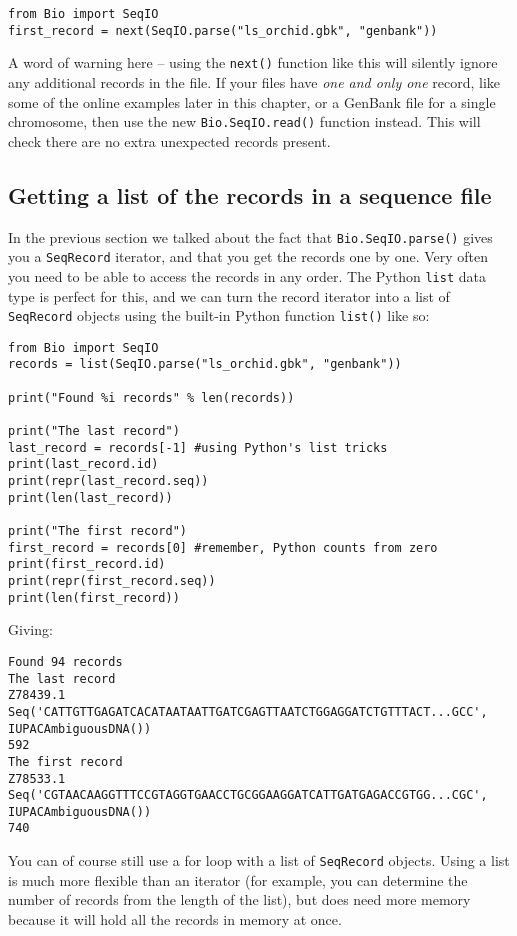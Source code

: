 \begin{verbatim}
from Bio import SeqIO
first_record = next(SeqIO.parse("ls_orchid.gbk", "genbank"))
\end{verbatim}

A word of warning here -- using the \verb|next()| function like this will silently ignore any additional records in the file.
If your files have {\it one and only one} record, like some of the online examples later in this chapter, or a GenBank file for a single chromosome, then use the new \verb|Bio.SeqIO.read()| function instead.
This will check there are no extra unexpected records present.

\subsection{Getting a list of the records in a sequence file}

In the previous section we talked about the fact that \verb|Bio.SeqIO.parse()| gives you a \verb|SeqRecord| iterator, and that you get the records one by one.  Very often you need to be able to access the records in any order. The Python \verb|list| data type is perfect for this, and we can turn the record iterator into a list of \verb|SeqRecord| objects using the built-in Python function \verb|list()| like so:

\begin{verbatim}
from Bio import SeqIO
records = list(SeqIO.parse("ls_orchid.gbk", "genbank"))

print("Found %i records" % len(records))

print("The last record")
last_record = records[-1] #using Python's list tricks
print(last_record.id)
print(repr(last_record.seq))
print(len(last_record))

print("The first record")
first_record = records[0] #remember, Python counts from zero
print(first_record.id)
print(repr(first_record.seq))
print(len(first_record))
\end{verbatim}

\noindent Giving:

\begin{verbatim}
Found 94 records
The last record
Z78439.1
Seq('CATTGTTGAGATCACATAATAATTGATCGAGTTAATCTGGAGGATCTGTTTACT...GCC', IUPACAmbiguousDNA())
592
The first record
Z78533.1
Seq('CGTAACAAGGTTTCCGTAGGTGAACCTGCGGAAGGATCATTGATGAGACCGTGG...CGC', IUPACAmbiguousDNA())
740
\end{verbatim}

You can of course still use a for loop with a list of \verb|SeqRecord| objects.  Using a list is much more flexible than an iterator (for example, you can determine the number of records from the length of the list), but does need more memory because it will hold all the records in memory at once.

